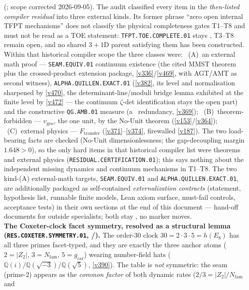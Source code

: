 \documentclass[11pt,a4paper]{article}
\newcommand{\Nfam}{N_{\mathrm{fam}}}
\newcommand{\gcar}{g_{\mathrm{car}}}
\begin{document}
\begin{keybox}
{(; scope corrected 2026-09-05).}  The audit
classified every item in the \emph{then-listed compiler residual} into three external kinds.  Its
former phrase ``zero open internal TFPT mechanisms'' does not classify the physical completeness
gates T1--T8 and must not be read as a TOE statement: \texttt{TFPT.TOE.COMPLETE.01} stays \mO,
T3--T8 remain open, and no shared $3{+}1$D parent satisfying them has been constructed.  Within
that historical compiler scope the three classes were: \mE\ (A)~an external math proof --- \texttt{SEAM.EQUIV.01} continuum existence (the
cited MMST theorem plus the crossed-product extension package, \vref{v336}/\vref{v469}, with AGT/AMT as second
witness), \texttt{ALPHA.QUILLEN.EXACT.01} (\vref{v382}, its level and normalisation sharpened by \vref{v470}, the
determinant-line/moduli bridge lemma exhibited at the finite level by \vref{v472} --- the continuum
$\zeta$-det identification stays the open part) and
the constructive \texttt{QG.AMB.01} measure (a \mC\ redundancy, \vref{v369}); \mE\ (B)~theorem-forbidden --- $v_{\mathrm{geo}}$, the
one unit, by the No-Unit theorem (\vref{v153}/\vref{v364}); \mE\ (C)~external physics --- $F_{\mathrm{transfer}}$
(\vref{v371}--\vref{v374}, firewalled \vref{v187}). The two load-bearing facts are checked (No-Unit
dimensionlessness; the gap-decoupling margin $1.648>0$), so the only hard items in that
historical compiler list were theorems and external physics
(\texttt{RESIDUAL.CERTIFICATION.01}); this says nothing about the independent missing dynamics
and continuum mechanisms in T1--T8. The two kind-(A) external-math
targets, \texttt{SEAM.EQUIV.01} and \texttt{ALPHA.QUILLEN.EXACT.01}, are additionally packaged as
self-contained \emph{externalization contracts} (statement, hypothesis list, runnable finite models,
Lean axiom surface, must-fail controls, acceptance tests) in their own sections at the end of this
document --- hand-off documents for outside specialists; both stay \mO, no marker moves.
\smallskip\\
\noindent\textbf{The Coxeter-clock facet symmetry, resolved as a structural lemma
(\texttt{RES.COXETER.SYMMETRY.01}, /).} The
order-$30$ clock $30=2{\cdot}3{\cdot}5=h(E_8)$ has all three primes facet-typed, and they are exactly the three
anchor atoms ($2{=}|Z_2|$, $3{=}\Nfam$, $5{=}\gcar$) wearing number-field hats
($\mathbb Q(i)/\mathbb Q(\sqrt{-3})/\mathbb Q(\sqrt5)$, \vref{v390}). The table is \emph{not} symmetric: the seam
(prime-$2$) appears as the \emph{common factor} of both dynamic rates ($2/3=|Z_2|/\Nfam$ and

\end{keybox}
\end{document}
